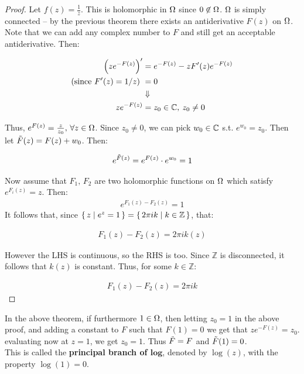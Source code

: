 \begin{proof} Let $f(z) = \frac{1}{z}$. This is holomorphic in $\Omega$ since $0 \not\in \Omega$. $\Omega$ is simply connected -- by the previous theorem there exists an antiderivative $F(z)$ on $\Omega$. Note that we can add any complex number to $F$ and still get an acceptable antiderivative. Then:

\begin{align*}
    \left( ze^{-F(z)} \right)' &= e^{-F(z)} - z F'(z) e^{-F(z)}\\
    \text{(since $F'(z) = 1/z$) }&= 0\\
    &\Downarrow\\
    ze^{-F(z)} &= z_0 \in \mathbb{C}, \: z_0 \neq 0
\end{align*}

Thus, $e^{F(z)} = \frac{z}{z_0}, \, \forall z \in \Omega$. Since $z_0 \neq 0$, we can pick $w_0 \in \mathbb{C}$ s.t. $e^{w_0} = z_0$. Then let $\Tilde{F} (z) = F(z) + w_0$. Then:

\begin{align*}
    e^{\Tilde{F} (z)} = e^{F (z)} \cdot e^{w_0} = 1
\end{align*}


Now assume that $F_1, \, F_2$ are two holomorphic functions on $\Omega$ which satisfy $e^{F_i(z)} = z$. Then:
\begin{align*}
e^{F_1(z) - F_2(z)} = 1
\end{align*}
It follows that, since $\set{z \mid e^z = 1} = \set{ 2 \pi i k \mid k \in \mathbb{Z}}$, that:

\begin{align*}
    F_1(z) - F_2(z) = 2 \pi i k(z)
\end{align*}

However the LHS is continuous, so the RHS is too. Since $\mathbb{Z}$ is disconnected, it follows that $k(z)$ is constant. Thus, for some $k \in \mathbb{Z}$:

\begin{align*}
    F_1(z) - F_2(z) = 2 \pi i k
\end{align*}

\end{proof}


\begin{remark}
In the above theorem, if furthermore $1 \in \Omega$, then letting $z_0 = 1$ in the above proof, and adding a constant to $F$ such that $F(1) = 0$ we get that $ze^{-F(z)} = z_0$. evaluating now at $z=1$, we get $z_0 = 1$. Thus $\Tilde{F} = F$ and $\Tilde{F} (1) = 0$.\\

This is called the \textbf{principal branch of $\mathbf{log}$}, denoted by $\log(z)$, with the property $\log(1) = 0$.
\end{remark}

